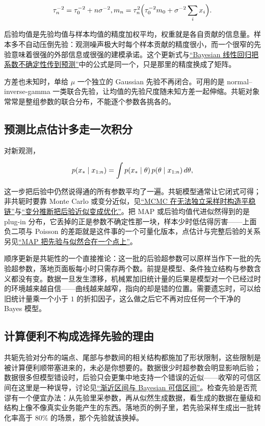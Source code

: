 \[
\tau_n^{-2}=\tau_0^{-2}+n\sigma^{-2},
\qquad
m_n=\tau_n^2\Bigl(\tau_0^{-2}m_0+\sigma^{-2}\sum_ix_i\Bigr).
\]

后验均值是先验均值与样本均值的精度加权平均，权重就是各自贡献的信息量。样本多不自动压倒先验：观测噪声极大时每个样本贡献的精度很小，而一个很窄的先验意味着很强的外部信息或很强的建模承诺。这个更新式与\hyperref[sec:13-Machine-Learning/02-Linear-Models/04]{``Bayesian 线性回归把系数不确定性传到预测''}中的公式是同一个，只是那里的精度换成了矩阵。

方差也未知时，单给 \(\mu\) 一个独立的 Gaussian 先验不再闭合。可用的是 normal--inverse-gamma 一类联合先验，让均值的先验尺度随未知方差一起伸缩。共轭对象常常是整组参数的联合分布，不能逐个参数各挑各的。

\subsection{预测比点估计多走一次积分}

对新观测，

\[
p(x_*\given x_{1:n})=\int p(x_*\given\theta)\,p(\theta\given x_{1:n})\,d\theta,
\]

这一步把后验中仍然说得通的所有参数平均了一遍。共轭模型通常让它闭式可得；非共轭时要靠 Monte Carlo 或变分近似，见\hyperref[sec:13-Machine-Learning/08-Sampling-and-Inference/02]{``MCMC 在无法独立采样时构造平稳链''}与\hyperref[sec:13-Machine-Learning/08-Sampling-and-Inference/03]{``变分推断把后验近似变成优化''}。把 MAP 或后验均值代进似然得到的是 plug-in 分布，它丢掉的正是参数不确定性那一块，样本少时低估得厉害——上面负二项与 Poisson 的差距就是这件事的一个可量化版本，点估计与完整后验的关系另见\hyperref[sec:11-Mathematical-Statistics/02-Point-Estimation/04]{``MAP 把先验与似然合在一个点上''}。

顺序更新是共轭性的一个直接推论：这一批的后验超参数可以原样当作下一批的先验超参数，落地页面板每小时只需存两个数。前提是模型、条件独立结构与参数含义都没有变。数据一旦发生漂移，机械累加旧统计量的后果是模型对一个已经过时的环境越来越自信——曲线越来越窄，指向的却是错的位置。需要遗忘时，可以给旧统计量乘一个小于 \(1\) 的折扣因子，这么做之后它不再对应任何一个干净的 Bayes 模型。

\subsection{计算便利不构成选择先验的理由}

共轭先验对分布的端点、尾部与参数间的相关结构都施加了形状限制，这些限制是被计算便利顺带塞进来的，未必是你想要的。数据很少时超参数会明显影响后验；数据很多但模型错设时，后验只会更集中地支持一个错误的近似——收窄的可信区间在这里是一种误导，讨论见\hyperref[sec:11-Mathematical-Statistics/04-Interval-Estimation/03]{``渐近区间与 Bayesian 可信区间''}。检查先验是否荒谬有一个便宜办法：从先验里采参数，再从似然生成数据，看生成的数据在量级和结构上像不像真实业务能产生的东西。落地页的例子里，若先验采样生成出一批转化率高于 \(80\%\) 的场景，那个先验就该换掉。

